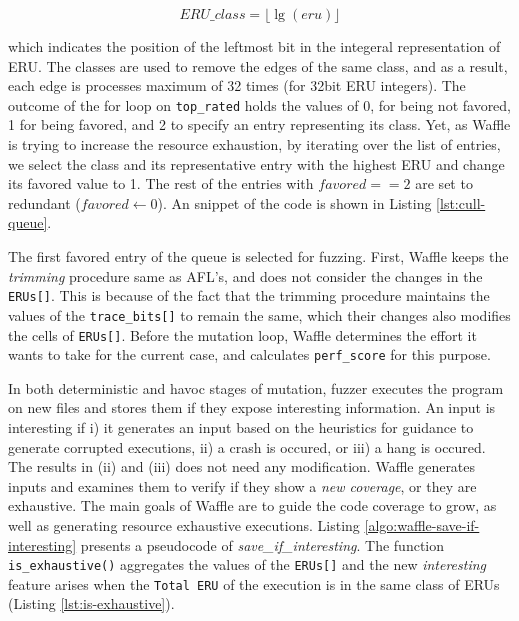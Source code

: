 \begin{equation}
  \label{eq:eru-class}
  ERU\_class = \lfloor \lg(eru) \rfloor  
\end{equation}

which indicates the position of the leftmost bit in the integeral representation of ERU. The classes are used to remove the edges of the same class, and as a result, each edge is processes maximum of 32 times (for 32bit ERU integers). The outcome of the for loop on \texttt{top\_rated} holds the values of 0, for being not favored, 1 for being favored, and 2 to specify an entry representing its class. Yet, as Waffle is trying to increase the resource exhaustion, by iterating over the list of entries, we select the class and its representative entry with the highest ERU and change its favored value to 1. The rest of the entries with $favored == 2$ are set to redundant ($ favored \leftarrow 0 $). An snippet of the code is shown in Listing \ref{lst:cull-queue}.




The first favored entry of the queue is selected for fuzzing. First, Waffle keeps the \textit{trimming} procedure same as AFL's, and does not consider the changes in the \texttt{ERUs[]}. This is because of the fact that the trimming procedure maintains the values of the \texttt{trace\_bits[]} to remain the same, which their changes also modifies the cells of \texttt{ERUs[]}. Before the mutation loop, Waffle determines the effort it wants to take for the current case, and calculates \texttt{perf\_score} for this purpose.


In both deterministic and havoc stages of mutation, fuzzer executes the program on new files and stores them if they expose interesting information. An input is interesting if i) it generates an input based on the heuristics for guidance to generate corrupted executions, ii) a crash is occured, or iii) a hang is occured. The results in (ii) and (iii) does not need any modification. Waffle generates inputs and examines them to verify if they show a \textit{new coverage}, or they are exhaustive. The main goals of Waffle are to guide the code coverage to grow, as well as generating resource exhaustive executions. Listing \ref{algo:waffle-save-if-interesting} presents a pseudocode of \textit{save\_if\_interesting}. The function \texttt{is\_exhaustive()} aggregates the values of the \texttt{ERUs[]} and the new \textit{interesting} feature arises when the \texttt{Total ERU} of the execution is in the same class of ERUs (Listing \ref{lst:is-exhaustive}). 




